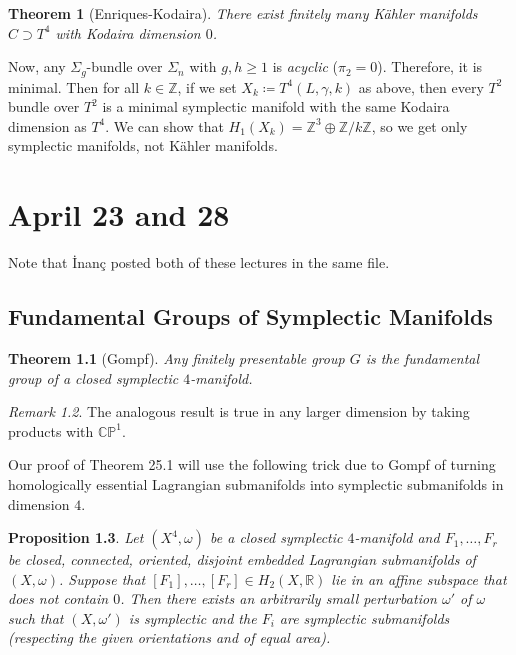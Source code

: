 \documentclass[leqno, openany]{memoir}
\newtheorem{thm}{Theorem}[chapter]
\newtheorem{prop}[thm]{Proposition}
\theoremstyle{definition}
\theoremstyle{remark}
\newtheorem{rmk}[thm]{Remark}
\theoremstyle{plain}
\theoremstyle{definition}
\theoremstyle{remark}
\newcommand{\R}{\mathbb{R}}
\renewcommand{\C}{\mathbb{C}}
\newcommand{\Z}{\mathbb{Z}}
\renewcommand{\P}{\mathbb{P}}
\begin{document}
    \begin{thm}[Enriques-Kodaira]
        There exist finitely many K\"ahler manifolds $C \supset T^4$ with Kodaira dimension $0$.
    \end{thm}

    Now, any $\Sigma_g$-bundle over $\Sigma_n$ with $g,h \geq 1$ is \textit{acyclic} ($\pi_2 = 0$). Therefore, it is minimal. Then for all $k \in \Z$, if we set $X_k \coloneqq T^4(L, \gamma, k)$ as above, then every $T^2$ bundle over $T^2$ is a minimal symplectic manifold with the same Kodaira dimension as $T^4$. We can show that $H_1(X_k) = \Z^3 \oplus \Z/k\Z$, so we get only symplectic manifolds, not K\"ahler manifolds.

    \chapter{April 23 and 28}%
    \label{cha:april_23_and_28}
    
    Note that \.Inan\c{c} posted both of these lectures in the same file.

    \section{Fundamental Groups of Symplectic Manifolds}%
    \label{sec:topology_of_symplectic_4_manifolds}
    
    \begin{thm}[Gompf]
        Any finitely presentable group $G$ is the fundamental group of a closed symplectic $4$-manifold.
    \end{thm}

    \begin{rmk}
        The analogous result is true in any larger dimension by taking products with $\C\P^1$.
    \end{rmk}

    Our proof of Theorem 25.1 will use the following trick due to Gompf of turning homologically essential Lagrangian submanifolds into symplectic submanifolds in dimension $4$.

    \begin{prop}
        Let $(X^4, \omega)$ be a closed symplectic $4$-manifold and $F_1, \ldots, F_r$ be closed, connected, oriented, disjoint embedded Lagrangian submanifolds of $(X, \omega)$. Suppose that $[F_1], \ldots, [F_r] \in H_2(X, \R)$ lie in an affine subspace that does not contain $0$. Then there exists an arbitrarily small perturbation $\omega'$ of $\omega$ such that $(X, \omega')$ is symplectic and the $F_i$ are symplectic submanifolds (respecting the given orientations and of equal area).
    \end{prop}
\end{document}
